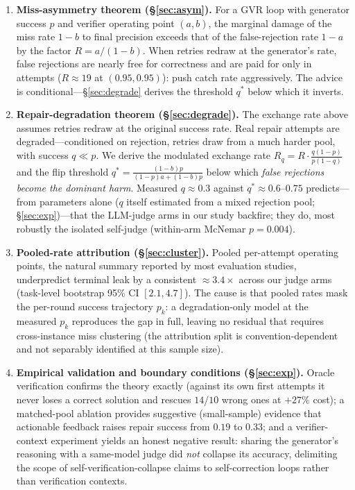 \documentclass[11pt]{article}
\begin{document}
\begin{enumerate}
\item \textbf{Miss-asymmetry theorem (§\ref{sec:asym}).}  For a GVR
loop with generator success $p$ and verifier operating point
$(a,b)$, the marginal damage of the miss rate $1-b$ to final
precision exceeds that of the false-rejection rate $1-a$ by the
factor $R = a/(1-b)$.  When retries redraw at the generator's rate,
false rejections are nearly free for correctness and are paid for
only in attempts ($R \approx 19$ at $(0.95,0.95)$): push catch rate
aggressively.  The advice is conditional---§\ref{sec:degrade} derives
the threshold $q^\ast$ below which it inverts.
\item \textbf{Repair-degradation theorem (§\ref{sec:degrade}).}  The
exchange rate above assumes retries redraw at the original success
rate.  Real repair attempts are degraded---conditioned on rejection,
retries draw from a much harder pool, with success $q \ll p$.  We
derive the modulated exchange rate
$R_q = R \cdot \frac{q(1-p)}{p(1-q)}$ and the flip threshold
$q^\ast = \frac{(1-b)p}{(1-p)a + (1-b)p}$ below which \emph{false
rejections become the dominant harm}.  Measured $q \approx 0.3$
against $q^\ast \approx 0.6$--$0.75$ predicts---from parameters
alone ($q$ itself estimated from a mixed rejection pool;
§\ref{sec:exp})---that the LLM-judge arms in our study backfire;
they do, most robustly the isolated self-judge (within-arm McNemar
$p = 0.004$).
\item \textbf{Pooled-rate attribution (§\ref{sec:cluster}).}
Pooled per-attempt operating points, the natural summary reported by
most evaluation studies, underpredict terminal leak by a consistent
$\approx 3.4\times$ across our judge arms (task-level bootstrap
95\% CI $[2.1, 4.7]$).  The cause is that pooled rates mask the
per-round success trajectory $p_k$: a degradation-only model at the
measured $p_k$ reproduces the gap in full, leaving no residual that
requires cross-instance miss clustering (the attribution split is
convention-dependent and not separably identified at this sample
size).
\item \textbf{Empirical validation and boundary conditions
(§\ref{sec:exp}).}  Oracle verification confirms the theory exactly
(against its own first attempts it never loses a correct solution
and rescues $14$/$10$ wrong ones at $+27\%$ cost); a matched-pool
ablation provides suggestive (small-sample) evidence that
actionable feedback raises repair success from $0.19$ to $0.33$;
and a
verifier-context experiment yields an honest negative
result: sharing the generator's reasoning with a same-model judge
did \emph{not} collapse its accuracy, delimiting the scope of
self-verification-collapse claims to self-correction loops rather
than verification contexts.
\end{enumerate}
\end{document}
